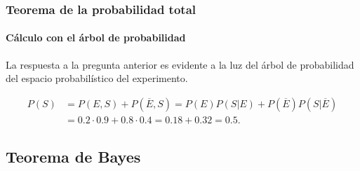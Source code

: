 \begin{frame}
\frametitle{Teorema de la probabilidad total}
\framesubtitle{Cálculo con el árbol de probabilidad}
La respuesta a la pregunta anterior es evidente a la luz del árbol de probabilidad del espacio probabilístico del experimento. 

\begin{center}
\end{center}

\begin{align*}
	P(S) &= P(E,S) + P(\overline E,S) = P(E)P(S|E)+P(\overline E)P(S|\overline E)\\
		& = 0.2\cdot 0.9+ 0.8\cdot 0.4 = 0.18 + 0.32 = 0.5.
\end{align*}

\end{frame}


\subsection{Teorema de Bayes}

